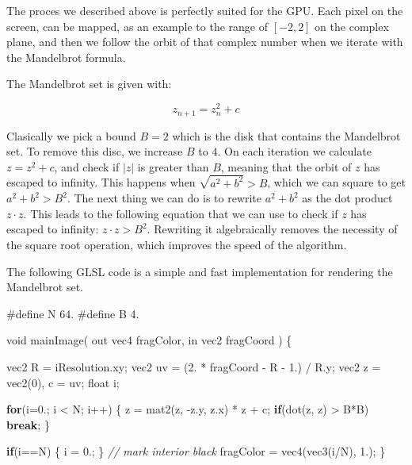 \documentclass[11pt]{article}
\newenvironment{Shaded}{}{}
\newcommand{\KeywordTok}[1]{\textcolor[rgb]{0.00,0.44,0.13}{\textbf{{#1}}}}
\newcommand{\DataTypeTok}[1]{\textcolor[rgb]{0.56,0.13,0.00}{{#1}}}
\newcommand{\DecValTok}[1]{\textcolor[rgb]{0.25,0.63,0.44}{{#1}}}
\newcommand{\FloatTok}[1]{\textcolor[rgb]{0.25,0.63,0.44}{{#1}}}
\newcommand{\CommentTok}[1]{\textcolor[rgb]{0.38,0.63,0.69}{\textit{{#1}}}}
\newcommand{\FunctionTok}[1]{\textcolor[rgb]{0.02,0.16,0.49}{{#1}}}
\newcommand{\NormalTok}[1]{{#1}}
\newcommand{\BuiltInTok}[1]{{#1}}
\newcommand{\PreprocessorTok}[1]{\textcolor[rgb]{0.74,0.48,0.00}{{#1}}}
\begin{document}
    The proces we described above is perfectly suited for the GPU. Each
pixel on the screen, can be mapped, as an example to the range of
\([-2, 2]\) on the complex plane, and then we follow the orbit of that
complex number when we iterate with the Mandelbrot formula.

    The Mandelbrot set is given with:

\[ z_{n+1} = z_n^2 + c \]

Clasically we pick a bound \(B=2\) which is the disk that contains the
Mandelbrot set. To remove this disc, we increase \(B\) to \(4\). On each
iteration we calculate \(z = z^2 + c\), and check if \(|z|\) is greater
than \(B\), meaning that the orbit of \(z\) has escaped to infinity.
This happens when \(\sqrt{a^2 + b^2} > B\), which we can square to get
\(a^2 + b^2 > B^2\). The next thing we can do is to rewrite
\(a^2 + b^2\) as the dot product \(z\cdot z\). This leads to the
following equation that we can use to check if \(z\) has escaped to
infinity: \(z\cdot z > B^2\). Rewriting it algebraically removes the
necessity of the square root operation, which improves the speed of the
algorithm.

    The following GLSL code is a simple and fast implementation for
rendering the Mandelbrot set.

    \begin{Shaded}
\begin{Highlighting}[]
\PreprocessorTok{#define N 64.}
\PreprocessorTok{#define B 4.}

\DataTypeTok{void} \FunctionTok{mainImage}\NormalTok{( }\DataTypeTok{out} \DataTypeTok{vec4}\NormalTok{ fragColor, }\DataTypeTok{in} \DataTypeTok{vec2}\NormalTok{ fragCoord ) \{}
    
    \DataTypeTok{vec2}\NormalTok{ R = iResolution.}\FunctionTok{xy}\NormalTok{;}
    \DataTypeTok{vec2}\NormalTok{ uv = (}\FloatTok{2.}\NormalTok{ * fragCoord - R - }\FloatTok{1.}\NormalTok{) / R.}\FunctionTok{y}\NormalTok{;}
    \DataTypeTok{vec2}\NormalTok{ z = }\DataTypeTok{vec2}\NormalTok{(}\DecValTok{0}\NormalTok{), c = uv;}
    \DataTypeTok{float}\NormalTok{ i;}

    \KeywordTok{for}\NormalTok{(i=}\FloatTok{0.}\NormalTok{; i < N; i++) \{}
\NormalTok{        z = }\DataTypeTok{mat2}\NormalTok{(z, -z.}\FunctionTok{y}\NormalTok{, z.}\FunctionTok{x}\NormalTok{) * z + c;}
        \KeywordTok{if}\NormalTok{(}\BuiltInTok{dot}\NormalTok{(z, z) > B*B) }\KeywordTok{break}\NormalTok{;}
\NormalTok{    \}}
    
    \KeywordTok{if}\NormalTok{(i==N) \{ i = }\FloatTok{0.}\NormalTok{; \} }\CommentTok{// mark interior black}
\NormalTok{    fragColor = }\DataTypeTok{vec4}\NormalTok{(}\DataTypeTok{vec3}\NormalTok{(i/N), }\FloatTok{1.}\NormalTok{);}
\NormalTok{\}}
\end{Highlighting}
\end{Shaded}
\end{document}
